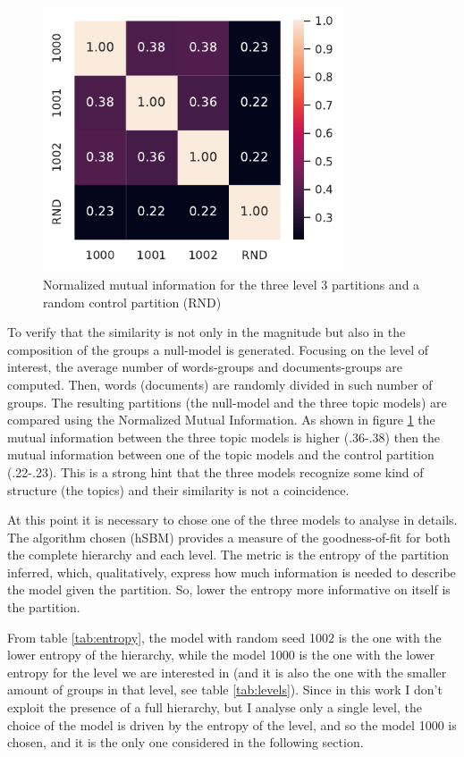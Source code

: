 \documentclass[a4paper, 11pt, headings=standardclasses, tablecaptionsbelow]{scrartcl}
\begin{document}
\begin{figure}[tb]
  \centering
  \includegraphics[width=3.5in]{src/mi.pdf}
  \caption[Mutual Information for the level of interest]{Normalized mutual information for the three level 3 partitions and a random control partition (RND)}
  \label{fig:mi}
\end{figure}

To verify that the similarity is not only in the magnitude but also in the composition of the groups a null-model is generated. Focusing on the level of interest, the average number of words-groups and documents-groups are computed. Then, words (documents) are randomly divided in such number of groups. The resulting partitions (the null-model and the three topic models) are compared using the Normalized Mutual Information. As shown in figure \ref{fig:mi} the mutual information between the three topic models is higher (.36-.38) then the mutual information between one of the topic models and the control partition (.22-.23). This is a strong hint that the three models recognize some kind of structure (the topics) and their similarity is not a coincidence.



At this point it is necessary to chose one of the three models to analyse in details. The algorithm chosen (hSBM) provides a measure of the goodness-of-fit for both the complete hierarchy and each level. The metric is the entropy of the partition inferred, which, qualitatively, express how much information is needed to describe the model given the partition. So, lower the entropy more informative on itself is the partition.

From table \ref{tab:entropy}, the model with random seed 1002 is the one with the lower entropy of the hierarchy, while the model 1000 is the one with the lower entropy for the level we are interested in (and it is also the one with the smaller amount of groups in that level, see table \ref{tab:levels}). Since in this work I don't exploit the presence of a full hierarchy, but I analyse only a single level, the choice of the model is driven by the entropy of the level, and so the model 1000 is chosen, and it is the only one considered in the following section.
\end{document}
